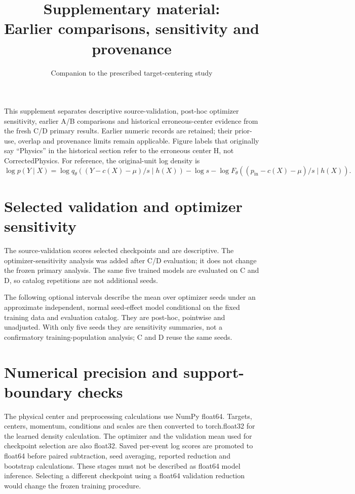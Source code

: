 \documentclass[11pt]{article}
\title{Supplementary material:\\Earlier comparisons, sensitivity and provenance}
\author{Companion to the prescribed target-centering study}
\date{}
\newcommand{\pin}{p_{\mathrm{in}}}
\begin{document}
\maketitle

This supplement separates descriptive source-validation, post-hoc optimizer
sensitivity, earlier A/B comparisons and historical erroneous-center evidence
from the fresh C/D primary results. Earlier numeric records are retained;
their prior-use, overlap and provenance limits remain applicable. Figure labels
that originally say ``Physics'' in the historical section refer to the erroneous
center H, not CorrectedPhysics. For reference, the original-unit log density is
\begin{equation}
\log p(Y\mid X)=\log q_\theta((Y-c(X)-\mu)/s\mid h(X))
 -\log s-\log F_\theta((\pin-c(X)-\mu)/s\mid h(X)).
\label{eq:likelihood}
\end{equation}

\section{Selected validation and optimizer sensitivity}
The source-validation scores selected checkpoints and are descriptive.
The optimizer-sensitivity analysis was added after C/D evaluation; it does
not change the frozen primary analysis. The same five trained models are
evaluated on C and D, so catalog repetitions are not additional seeds.

\clearpage

\clearpage
The following optional intervals describe the mean over optimizer seeds under
an approximate independent, normal seed-effect model conditional on the fixed
training data and evaluation catalog. They are post-hoc, pointwise and
unadjusted. With only five seeds they are sensitivity summaries, not a
confirmatory training-population analysis; C and D reuse the same seeds.

\clearpage
\section{Numerical precision and support-boundary checks}
\label{sec:numerical_boundary}

The physical center and preprocessing calculations use NumPy float64. Targets,
centers, momentum, conditions and scales are then converted to torch.float32
for the learned density calculation. The optimizer and the validation mean
used for checkpoint selection are also float32. Saved per-event log scores are
promoted to float64 before paired subtraction, seed averaging, reported
reduction and bootstrap calculations. These stages must not be described as
float64 model inference. Selecting a different checkpoint using a float64
validation reduction would change the frozen training procedure.
\end{document}
